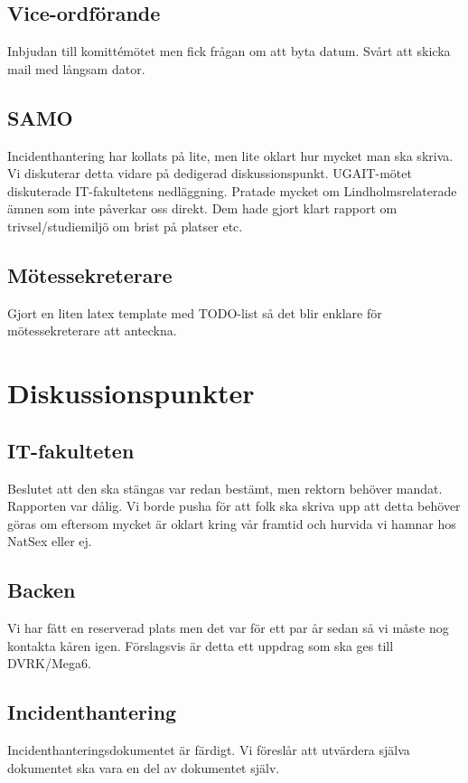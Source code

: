 \documentclass[protokoll]{dvd}
\begin{document}
\subsection{Vice-ordförande}
Inbjudan till komittémötet men fick frågan om att byta datum. Svårt att skicka mail med långsam dator.

\subsection{SAMO}
Incidenthantering har kollats på lite, men lite oklart hur mycket man ska skriva. Vi diskuterar detta vidare på dedigerad diskussionspunkt.
UGAIT-mötet diskuterade IT-fakultetens nedläggning. Pratade mycket om Lindholmsrelaterade ämnen som inte påverkar oss direkt. Dem hade gjort klart rapport om trivsel/studiemiljö om brist på platser etc.

\subsection{Mötessekreterare}
Gjort en liten latex template med TODO-list så det blir enklare för mötessekreterare att anteckna.

\newpage

\section{Diskussionspunkter}

\subsection*{IT-fakulteten}
Beslutet att den ska stängas var redan bestämt, men rektorn behöver mandat. Rapporten var dålig. Vi borde pusha för att folk ska skriva upp att detta behöver göras om eftersom mycket är oklart kring vår framtid och hurvida vi hamnar hos NatSex eller ej.

\subsection*{Backen}
Vi har fått en reserverad plats men det var för ett par år sedan så vi måste nog kontakta kåren igen. Förslagsvis är detta ett uppdrag som ska ges till DVRK/Mega6.

\subsection*{Incidenthantering}
Incidenthanteringsdokumentet är färdigt. Vi föreslår att utvärdera själva dokumentet ska vara en del av dokumentet själv.
\end{document}
